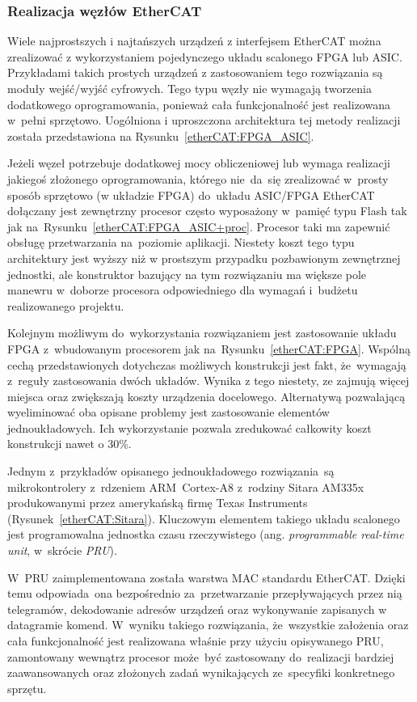 \subsubsection{Realizacja węzłów EtherCAT}
Wiele najprostszych i najtańszych urządzeń z interfejsem EtherCAT można zrealizować z wykorzystaniem pojedynczego układu scalonego FPGA lub ASIC. Przykładami takich prostych urządzeń z zastosowaniem tego rozwiązania są moduły wejść/wyjść cyfrowych. Tego typu węzły nie wymagają tworzenia dodatkowego oprogramowania, ponieważ cała funkcjonalność jest realizowana w~pełni sprzętowo. Uogólniona i uproszczona architektura tej metody realizacji została przedstawiona na Rysunku~\ref{etherCAT:FPGA_ASIC}.

Jeżeli węzeł potrzebuje dodatkowej mocy obliczeniowej lub wymaga realizacji jakiegoś złożonego oprogramowania, którego nie~da~się zrealizować w~prosty sposób sprzętowo (w układzie FPGA) do~układu ASIC/FPGA EtherCAT dołączany jest zewnętrzny procesor często wyposażony w~pamięć typu Flash tak jak na~Rysunku~\ref{etherCAT:FPGA_ASIC+proc}. Procesor taki ma zapewnić obsługę przetwarzania na~poziomie aplikacji. Niestety koszt tego typu architektury jest wyższy niż w prostszym przypadku pozbawionym zewnętrznej jednostki, ale konstruktor bazujący na tym rozwiązaniu ma większe pole manewru w~doborze procesora odpowiedniego dla wymagań i~budżetu realizowanego projektu.

Kolejnym możliwym do~wykorzystania rozwiązaniem jest zastosowanie układu FPGA z~wbudowanym procesorem jak na~Rysunku~\ref{etherCAT:FPGA}. Wspólną cechą przedstawionych dotychczas możliwych konstrukcji jest fakt, że~wymagają z~reguły zastosowania dwóch układów. Wynika z tego niestety, ze zajmują więcej miejsca oraz zwiększają koszty urządzenia docelowego. Alternatywą pozwalającą wyeliminować oba opisane problemy jest zastosowanie elementów jednoukładowych. Ich wykorzystanie pozwala zredukować całkowity koszt konstrukcji nawet o 30\%.

Jednym z~przykładów opisanego jednoukładowego rozwiązania~są mikrokontrolery z~rdzeniem ARM~Cortex-A8 z~rodziny Sitara AM335x produkowanymi przez amerykańską firmę Texas Instruments (Rysunek~\ref{etherCAT:Sitara}). Kluczowym elementem takiego układu scalonego jest programowalna jednostka czasu rzeczywistego (ang. \textit{programmable real-time unit}, w~skrócie \textit{PRU}). 
\clearpage

W~PRU zaimplementowana została warstwa MAC standardu EtherCAT. Dzięki temu odpowiada~ona bezpośrednio za~przetwarzanie przepływających przez nią telegramów, dekodowanie adresów urządzeń oraz wykonywanie zapisanych w datagramie komend. W~wyniku takiego rozwiązania, że~wszystkie założenia oraz cała funkcjonalność jest realizowana właśnie przy użyciu opisywanego PRU, zamontowany wewnątrz procesor może~być zastosowany do~realizacji bardziej zaawansowanych oraz złożonych zadań wynikających ze~specyfiki konkretnego sprzętu.

